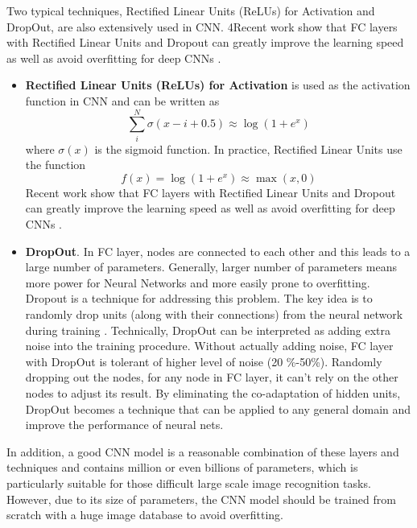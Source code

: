 Two typical techniques, Rectified Linear Units (ReLUs) for Activation and DropOut, are also extensively used in CNN. 4Recent work show that FC layers with Rectified Linear Units and Dropout can greatly improve the learning speed as well as avoid overfitting for deep CNNs \cite{hinton2012improving} \cite{nair2010rectified}.
\begin{itemize}
	\item \textbf{Rectified Linear Units (ReLUs) for Activation} is used as the activation function in CNN and can be written as 
	\begin{equation}
	\sum\limits_i^N {\sigma (x - i + 0.5)}  \approx \log (1 + {e^x})
	\end{equation}
	where $\sigma(x)$ is the sigmoid function. In practice, Rectified Linear Units use the function 
	\begin{equation}
	f(x) = \log (1 + {e^x}) \approx \max(x,0) 
	\end{equation}\label{eq:intro:relu}
	Recent work show that FC layers with Rectified Linear Units and Dropout can greatly improve the learning speed as well as avoid overfitting for deep CNNs \cite{hinton2012improving} \cite{nair2010rectified}.
	
	\item \textbf{DropOut}. In FC layer, nodes are connected to each other and this leads to a large number of parameters. Generally, larger number of parameters means more power for Neural Networks and more easily prone to overfitting. Dropout is a technique for addressing this problem. 	The key idea is to randomly drop units (along with their connections) from the neural network during training \cite{srivastava2014dropout}. Technically, DropOut can be interpreted as adding extra noise into the training procedure. Without actually adding noise, FC layer with DropOut is tolerant of higher level of noise (20 \%-50\%). Randomly dropping out the nodes, for any node in FC layer, it can't rely on the other nodes to adjust its result. By eliminating the co-adaptation of hidden units, DropOut becomes a technique that can be applied to any general domain and improve the performance of neural nets.   
\end{itemize}

In addition, a good CNN model is a reasonable combination of these layers and techniques and contains million or even billions of parameters, which is particularly suitable for those difficult large scale image recognition tasks. However, due to its size of parameters, the CNN model should be trained from scratch with a huge image database to avoid overfitting.


